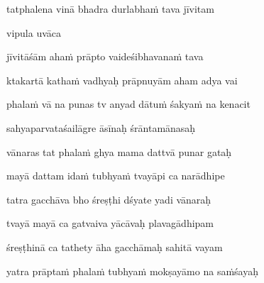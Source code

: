 tatphalena vinā bhadra durlabhaṁ tava jīvitam \veg\dontdisplaylinenum

vipula uvāca~{\dandab}\dontdisplaylinenum 

jīvitāśām ahaṁ prāpto vaideśibhavanaṁ tava\thinspace{\danda} \dontdisplaylinenum

ktakartā kathaṁ vadhyaḥ prāpnuyām aham adya vai \veg\dontdisplaylinenum
{}

phalaṁ vā na punas tv anyad dātuṁ śakyaṁ na kenacit\thinspace{\dandab} \dontdisplaylinenum
{}

sahyaparvataśailāgre āsīnaḥ śrāntamānasaḥ \veg\dontdisplaylinenum
{}

vānaras tat phalaṁ ghya mama dattvā punar gataḥ\thinspace{\dandab} \dontdisplaylinenum
{}

mayā dattam idaṁ tubhyaṁ tvayāpi ca narādhipe \veg\dontdisplaylinenum
{}

tatra gacchāva bho śreṣṭhi dśyate yadi vānaraḥ\thinspace{\dandab} \dontdisplaylinenum

tvayā mayā ca gatvaiva yācāvaḥ plavagādhipam \veg\dontdisplaylinenum
{}

śreṣṭhinā ca tathety āha gacchāmaḥ sahitā vayam\thinspace{\dandab} \dontdisplaylinenum
{}

yatra prāptaṁ phalaṁ tubhyaṁ mokṣayāmo na saṁśayaḥ \veg\dontdisplaylinenum
{}

